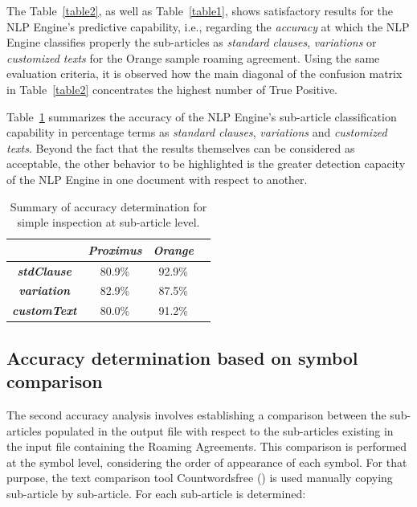 \documentclass[conference]{style/IEEEtran}
\begin{document}
The Table~\ref{table2}, as well as Table~\ref{table1}, shows satisfactory results for the NLP Engine's predictive capability, i.e., regarding the \textit{accuracy} at which the NLP Engine classifies properly the sub-articles as \textit{standard clauses}, \textit{variations} or \textit{customized texts} for the Orange sample roaming agreement. Using the same evaluation criteria, it is observed how the main diagonal of the confusion matrix in Table~\ref{table2} concentrates the highest number of True Positive.

Table~\ref{table3} summarizes the accuracy of the NLP Engine's sub-article classification capability in percentage terms as \textit{standard clauses}, \textit{variations} and \textit{customized texts}. Beyond the fact that the results themselves can be considered as acceptable, the other behavior to be highlighted is the greater detection capacity of the NLP Engine in one document with respect to another.

\begin{table}[htbp]
\caption{Summary of accuracy determination for simple inspection at sub-article level.}
\begin{center}
\begin{tabular}{|c|c|c|c|}
\hline
\textbf{} & \textbf{\textit{Proximus}}& \textbf{\textit{Orange}} \\
\hline
\textbf{\textit{stdClause}}& 80.9\% & 92.9\% \\
\hline
\textbf{\textit{variation}}& 82.9\% & 87.5\% \\
\hline
\textbf{\textit{customText}}& 80.0\% & 91.2\% \\
\hline
\end{tabular}
\label{table3}
\end{center}
\end{table}

\subsection{Accuracy determination based on symbol comparison}
The second accuracy analysis involves establishing a comparison between the sub-articles populated in the output file with respect to the sub-articles existing in the input file containing the Roaming Agreements. This comparison is performed at the symbol level, considering the order of appearance of each symbol. For that purpose, the text comparison tool Countwordsfree (\cite{countwordsfree}) is used manually copying sub-article by sub-article. For each sub-article is determined:
\end{document}
